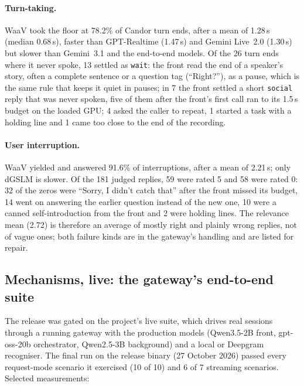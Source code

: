 \paragraph{Turn-taking.} WaaV took the floor at 78.2\% of Candor turn ends, after a mean of 1.28\,s (median
0.68\,s), faster than GPT-Realtime (1.47\,s) and Gemini Live~2.0 (1.30\,s) but slower than Gemini~3.1 and
the end-to-end models. Of the 26 turn ends where it never spoke, 13 settled as \texttt{wait}: the front read
the end of a speaker's story, often a complete sentence or a question tag (``Right?''), as a pause, which is
the same rule that keeps it quiet in pauses; in 7 the front settled a short \texttt{social} reply that was
never spoken, five of them after the front's first call ran to its 1.5\,s budget on the loaded GPU; 4 asked
the caller to repeat, 1 started a task with a holding line and 1 came too close to the end of the recording.

\paragraph{User interruption.} WaaV yielded and answered 91.6\% of interruptions, after a mean of 2.21\,s;
only dGSLM is slower. Of the 181 judged replies, 59 were rated 5 and 58 were rated 0: 32 of the zeros were
``Sorry, I didn't catch that'' after the front missed its budget, 14 went on answering the earlier question
instead of the new one, 10 were a canned self-introduction from the front and 2 were holding lines. The
relevance mean (2.72) is therefore an average of mostly right and plainly wrong replies, not of vague ones;
both failure kinds are in the gateway's handling and are listed for repair.

\subsection{Mechanisms, live: the gateway's end-to-end suite}\label{sec:eval-live}

The release was gated on the project's live suite, which drives real sessions through a running gateway with
the production models (Qwen3.5-2B front, gpt-oss-20b orchestrator, Qwen2.5-3B background) and a local or
Deepgram recogniser. The final run on the release binary (27 October 2026) passed every request-mode scenario
it exercised (10 of 10) and 6 of 7 streaming scenarios. Selected measurements:

